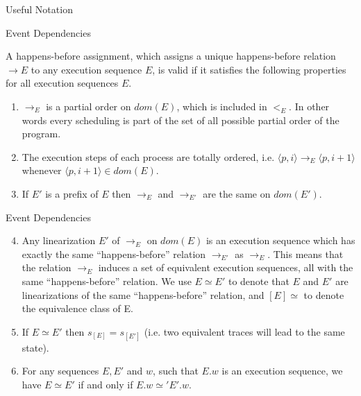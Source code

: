 \documentclass[9pt]{beamer}
\begin{document}
\begin{frame}{Useful Notation}
    
\end{frame}

\begin{frame}{Event Dependencies}

    \begin{definition}
    A happens-before assignment, which assigns a
    unique happens-before relation $\rightarrow E$ to any execution sequence
    $E$, is valid if it satisfies the following properties for all execution
    sequences $E$.
    \begin{enumerate}
        \item $\rightarrow_{E}$ is a partial order on $dom(E)$, which is included in $<_E$. In other words every
        scheduling is part of the set of all possible partial order of the program.
        \item The execution steps of each process are totally ordered, i.e. 
        $\langle p,i \rangle \rightarrow_E \langle p,i+1 \rangle$ whenever $\langle p, i+1 \rangle \in dom(E)$.
        \item If $E'$ is a prefix of $E$ then $\rightarrow_E$ and $\rightarrow_{E'}$ are the same on $dom(E')$.
    \end{enumerate}
\end{definition}
\end{frame}

\begin{frame}{Event Dependencies}

    \begin{enumerate}
        \setcounter{enumi}{3}
        \item Any linearization $E'$ of $\rightarrow_E$ on $dom(E)$ is an execution sequence which has exactly the same
“happens-before” relation $\rightarrow_{E'}$ as $\rightarrow_E$. This means that the relation $\rightarrow_E$ induces a
set of equivalent execution sequences, all with the same “happens-before” relation. We use $E \simeq E'$ to denote that
$E$ and $E'$ are linearizations of the same “happens-before” relation, and $[E] \simeq$ to denote the equivalence class
of E.
    \item If $E \simeq E'$ then $s_{[E]} = s_{[E']}$ (i.e. two equivalent traces will lead to the same state).
    \item For any sequences $E, E'$ and $w$, such that $E.w$ is an execution
sequence, we have $E \simeq E'$  if and only if $E.w \simeq' E'.w$.
    \end{enumerate}
    
\end{frame}
\end{document}

